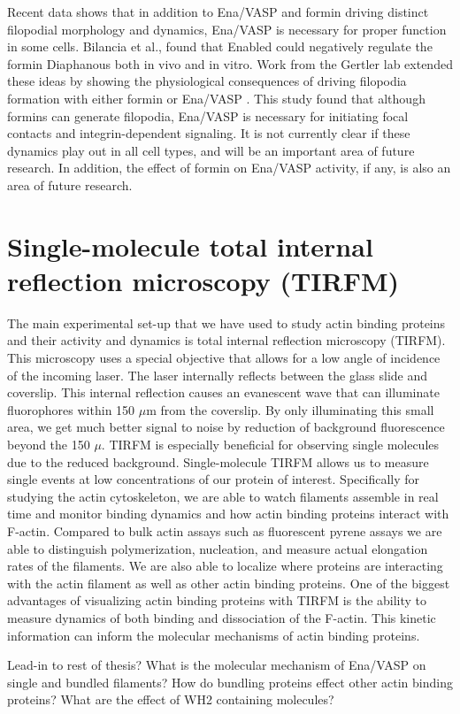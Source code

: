 Recent data shows that in addition to Ena/VASP and formin driving distinct filopodial morphology and dynamics, Ena/VASP is necessary for proper function in some cells. Bilancia et al., found that Enabled could negatively regulate the formin Diaphanous both in vivo and in vitro. Work from the Gertler lab extended these ideas by showing the physiological consequences of driving filopodia formation with either formin or Ena/VASP \citep{barzik_ena/vasp_2005}. This study found that although formins can generate filopodia, Ena/VASP is necessary for initiating focal contacts and integrin-dependent signaling. It is not currently clear if these dynamics play out in all cell types, and will be an important area of future research. In addition, the effect of formin on Ena/VASP activity, if any, is also an area of future research.

\section{Single-molecule total internal reflection microscopy (TIRFM)}\label{tirfm}
The main experimental set-up that we have used to study actin binding proteins and their activity and dynamics is total internal reflection microscopy (TIRFM). This microscopy uses a special objective that allows for a low angle of incidence of the incoming laser. The laser internally reflects between the glass slide and coverslip. This internal reflection causes an evanescent wave that can illuminate fluorophores within 150 $\mu$m from the coverslip. By only illuminating this small area, we get much better signal to noise by reduction of background fluorescence beyond the 150 $\mu$. TIRFM is especially beneficial for observing single molecules due to the reduced background. Single-molecule TIRFM allows us to measure single events at low concentrations of our protein of interest. Specifically for studying the actin cytoskeleton, we are able to watch filaments assemble in real time and monitor binding dynamics and how actin binding proteins interact with F-actin. Compared to bulk actin assays such as fluorescent pyrene assays we are able to distinguish polymerization, nucleation, and measure actual elongation rates of the filaments. We are also able to localize where proteins are interacting with the actin filament as well as other actin binding proteins. One of the biggest advantages of visualizing actin binding proteins with TIRFM is the ability to measure dynamics of both binding and dissociation of the F-actin. This kinetic information can inform the molecular mechanisms of actin binding proteins. 


Lead-in to rest of thesis?
What is the molecular mechanism of Ena/VASP on single and bundled filaments?
How do bundling proteins effect other actin binding proteins?
What are the effect of WH2 containing molecules?
